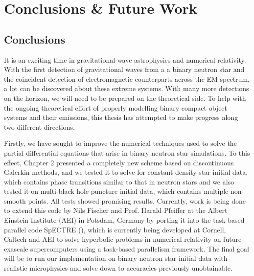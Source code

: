 \chapter{Conclusions \& Future Work}
\label{chap:conc}

\section{Conclusions}

It is an exciting time in gravitational-wave astrophysics and numerical relativity. With the first detection of gravitational waves from a a binary neutron star and the coincident detection of electromagnetic counterparts across the EM spectrum, a lot can be discovered about these extreme systems. With many more detections on the horizon, we will need to be prepared on the theoretical side. To help with the ongoing theoretical effort of properly modelling binary compact object systems and their emissions, this thesis has attempted to make progress along two different directions.

Firstly, we have sought to improve the numerical techniques used to solve the partial differential equations that arise in binary neutron star simulations. To this effect, Chapter 2 presented a completely new scheme based on discontinuous Galerkin methods, and we tested it to solve for constant density star initial data, which contains phase transitions similar to that in neutron stars and we also tested it on multi-black hole puncture initial data, which contains multiple non-smooth points. All tests showed promising results. Currently, work is being done to extend this code by Nils Fischer and Prof. Harald Pfeiffer at the Albert Einstein Institute (AEI) in Potsdam, Germany by porting it into the task based parallel code SpECTRE (\cite{kidder2016spectre}), which is currently being developed at Cornell, Caltech and AEI to solve hyperbolic problems in numerical relativity on future exascale supercomputers using a task-based parallelism framework. The final goal will be to run our implementation on binary neutron star initial data with realistic microphysics and solve down to accuracies previously unobtainable.

